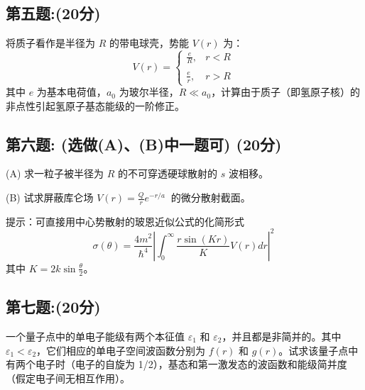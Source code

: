 \subsection{第五题:(20分)}
将质子看作是半径为 \(R\) 的带电球壳，势能 \(V(r)\) 为：
\[V(r) = \begin{cases} \frac{e}{R}, & r < R \\\\\frac{e}{r}, & r > R\end{cases}~\]
其中 \(e\) 为基本电荷值，\(a_0\) 为玻尔半径，\(R \ll a_0\)，计算由于质子（即氢原子核）的非点性引起氢原子基态能级的一阶修正。
\subsection{第六题: (选做(A)、(B)中一题可) (20分)}
(A) 求一粒子被半径为 \(R\) 的不可穿透硬球散射的 \(s\) 波相移。

(B) 试求屏蔽库仑场 \(V(r) = \frac{Q}{r} e^{-r/a}~\) 的微分散射截面。

提示：可直接用中心势散射的玻恩近似公式的化简形式
\[\sigma(\theta) = \frac{4m^2}{\hbar^4} \left| \int_0^\infty \frac{r \sin(Kr)}{K} V(r) dr \right|^2~\]
其中 \(K = 2k \sin\frac{\theta}{2}\)。
\subsection{第七题:(20分)}
一个量子点中的单电子能级有两个本征值 $\varepsilon_1$ 和 $\varepsilon_2$，并且都是非简并的。其中 $\varepsilon_1 < \varepsilon_2$，它们相应的单电子空间波函数分别为 $f(r)$ 和 $g(r)$。试求该量子点中有两个电子时（电子的自旋为 1/2），基态和第一激发态的波函数和能级简并度（假定电子间无相互作用）。